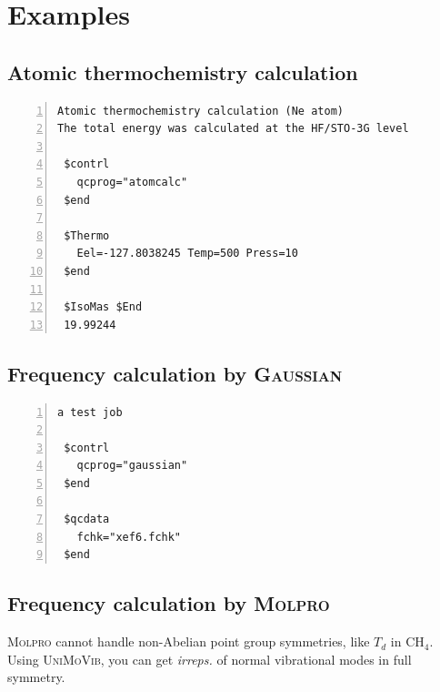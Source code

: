 \documentclass[12pt,english]{extarticle}
\begin{document}
\pagebreak{}


\section{Examples} \label{part:examp}

\subsection{Atomic thermochemistry calculation} \label{sec:exp1}

\begin{Verbatim}[frame=single,label=example,labelposition=topline,numbers=left,rulecolor=\color{green},fontsize=\footnotesize,baselinestretch=1.0]
Atomic thermochemistry calculation (Ne atom)
The total energy was calculated at the HF/STO-3G level

 $contrl
   qcprog="atomcalc"
 $end

 $Thermo
   Eel=-127.8038245 Temp=500 Press=10
 $end

 $IsoMas $End
 19.99244
\end{Verbatim}

\subsection{Frequency calculation by \textsc{Gaussian}} \label{sec:exp2}

\begin{Verbatim}[frame=single,label=example,labelposition=topline,numbers=left,rulecolor=\color{green},fontsize=\footnotesize,baselinestretch=1.0]
a test job

 $contrl
   qcprog="gaussian"
 $end

 $qcdata
   fchk="xef6.fchk"
 $end
\end{Verbatim}

\subsection{Frequency calculation by \textsc{Molpro}} \label{sec:exp3}

\textsc{Molpro} cannot handle non-Abelian point group symmetries, like $T_d$ in CH$_4$. Using \textsc{UniMoVib}, you can get \emph{irreps.} of normal vibrational modes in full symmetry.
\end{document}
